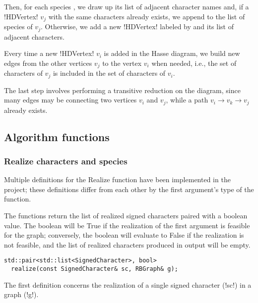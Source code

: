 Then, for each species \species[i], we draw up its list of adjacent character names and, if a !HDVertex! $v_{j}$ with the same characters already exists, we append \species[i] to the list of species of $v_{j}$.
Otherwise, we add a new !HDVertex! labeled by \species[i] and its list of adjacent characters.

Every time a new !HDVertex! $v_{i}$ is added in the Hasse diagram, we build new edges from the other vertices $v_{j}$ to the vertex $v_{i}$ when needed, i.e., the set of characters of $v_{j}$ is included in the set of characters of $v_{i}$.

The last step involves performing a transitive reduction on the diagram, since many edges may be connecting two vertices $v_{i}$ and $v_{j}$, while a path $v_{i} \rightarrow v_{k} \rightarrow v_{j}$ already exists.

\subsection{Algorithm functions}\label{section:algorithm-functions}


\subsubsection{Realize characters and species}\label{section:realize}

Multiple definitions for the Realize function have been implemented in the project; these definitions differ from each other by the first argument's type of the function.

The functions return the list of realized signed characters paired with a boolean value.
The boolean will be True if the realization of the first argument is feasible for the graph; conversely, the boolean will evaluate to False if the realization is not feasible, and the list of realized characters produced in output will be empty.

\text{} %

\begin{lstlisting}[moreemph={RBGraph, SignedCharacter},
                   moreemph={[2]realize}]
  std::pair<std::list<SignedCharacter>, bool>
  realize(const SignedCharacter& sc, RBGraph& g);
\end{lstlisting}

The first definition concerns the realization of a single signed character \character[][\pm] (!sc!) in a graph \grb{} (!g!).

